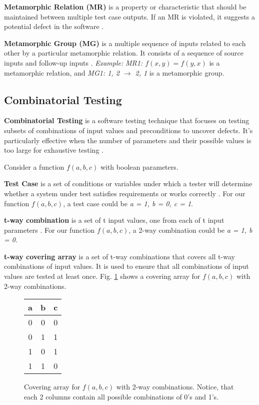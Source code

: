 \textbf{Metamorphic Relation (MR)} is a property or characteristic that should be maintained between multiple test case outputs. If an MR is violated, it suggests a potential defect in the software \cite{MetamorphicTestingReview}.

\textbf{Metamorphic Group (MG)} is a multiple sequence of inputs related to each other by a particular metamorphic relation. It consists of a sequence of source inputs and follow-up inputs \cite{MetamorphicTestingReview}. \textit{Example:} \textit{MR1: $f(x, y) = f(y, x)$} is a metamorphic relation, and \textit{MG1: {1, 2} $\rightarrow$ {2, 1}} is a metamorphic group.

\subsection{Combinatorial Testing}

\textbf{Combinatorial Testing} is a software testing technique that focuses on testing subsets of combinations of input values and preconditions to uncover defects. It's particularly effective when the number of parameters and their possible values is too large for exhaustive testing \cite{FELDERER20161}.

Consider a function $f(a, b, c)$ with boolean parameters.

\textbf{Test Case} is a set of conditions or variables under which a tester will determine whether a system under test satisfies requirements or works correctly \cite{comer}. For our function $f(a, b, c)$, a test case could be \textit{a = 1, b = 0, c = 1}.

\textbf{t-way combination} is a set of t input values, one from each of t input parameters \cite{comer}. For our function $f(a, b, c)$, a 2-way combination could be \textit{a = 1, b = 0}.

\textbf{t-way covering array} is a set of t-way combinations that covers all t-way combinations of input values. It is used to ensure that all combinations of input values are tested at least once. Fig. \ref{fig:CovArray} shows a covering array for $f(a, b, c)$ with 2-way combinations.

\begin{figure}
\centering
\begin{tabular}{|c|c|c|}
    \hline
    a & b & c \\
    \hline
    0 & 0 & 0 \\
    0 & 1 & 1 \\
    1 & 0 & 1 \\
    1 & 1 & 0 \\
    \hline
\end{tabular}
\caption{Covering array for $f(a, b, c)$ with 2-way combinations. Notice, that each 2 columns contain all possible combinations of 0's and 1's.}
\label{fig:CovArray}
\end{figure}

